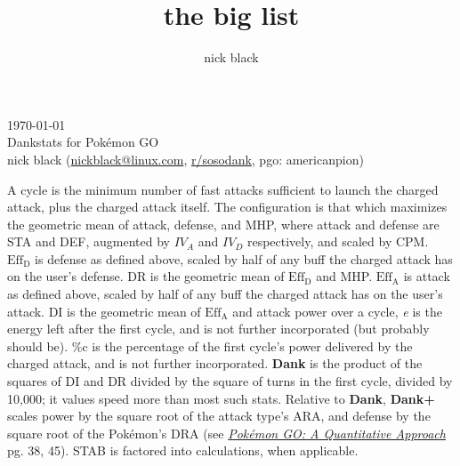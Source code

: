 \documentclass[ebook,10pt,openany,oneside]{memoir}
\title{the big list}
\author{nick black}
\newcommand*{\Eff}[1]{\mbox{$\mathrm{Eff_{#1}}$}}
\begin{document}
\noindent{}\today\\
Dankstats for Pokémon GO\\
nick black (\href{mailto:nickblack@linux.com}{nickblack@linux.com}, \href{https://www.reddit.com/user/sosodank/}{r/sosodank}, pgo: americanpion)\\
\bigskip

A cycle is the minimum number of fast attacks sufficient to launch the charged attack, plus the charged attack itself.
The configuration is that which maximizes the geometric mean of attack, defense, and MHP, where attack and defense are STA and DEF, augmented by $IV_A$ and $IV_D$ respectively, and scaled by CPM.
\Eff{D} is defense as defined above, scaled by half of any buff the charged attack has on the user's defense.
DR is the geometric mean of \Eff{D} and MHP.
\Eff{A} is attack as defined above, scaled by half of any buff the charged attack has on the user's attack.
DI is the geometric mean of \Eff{A} and attack power over a cycle,
\textit{e} is the energy left after the first cycle, and is not further incorporated (but probably should be).
\%c is the percentage of the first cycle's power delivered by the charged attack, and is not further incorporated.
\textbf{Dank} is the product of the squares of DI and DR divided by the square of turns in the first cycle, divided by 10,000; it values speed more than most such stats.
Relative to \textbf{Dank}, \textbf{Dank+} scales power by the square root of the attack type's ARA, and defense by the square root of the Pokémon's DRA (see \textit{\href{https://nick-black.com/pgo-quantitative.pdf}{Pokémon GO: A Quantitative Approach}} pg. 38, 45).
STAB is factored into calculations, when applicable.
\bigskip

\footnotesize
\setlength{\tabcolsep}{2pt}



\end{document}
